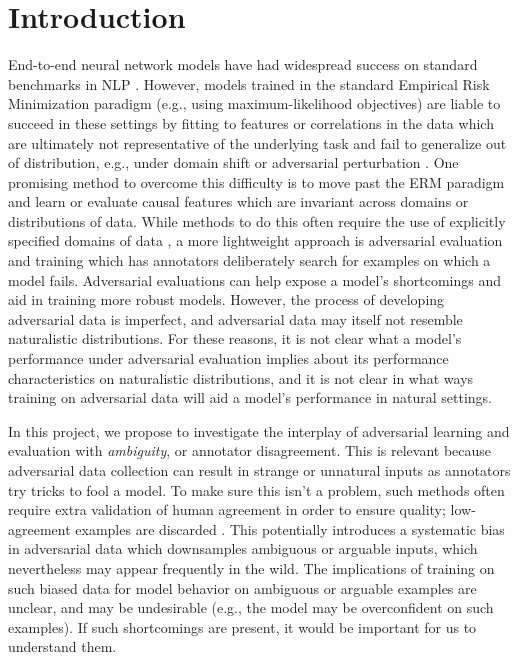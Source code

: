 \documentclass[10pt,a4paper]{article}
\newcommand{\eg}{e.g.}
\begin{document}
\section{Introduction}
End-to-end neural network models have had widespread success on standard benchmarks in NLP
\citep{wang2018glue,wang2019superglue,lee2017end,dozat2017deep}.
However, models trained in the standard Empirical Risk Minimization paradigm (\eg, using
maximum-likelihood objectives) are liable to succeed in these settings by fitting to features or
correlations in the data which are ultimately not representative of the underlying task and fail to
generalize out of distribution, \eg, under domain shift or adversarial perturbation
\citep{gururangan2018annotation,ilyas-etal-2019-adversarial}.
One promising method to overcome this difficulty is to move past the ERM paradigm and learn or
evaluate causal features which are invariant across domains or distributions of data.
While methods to do this often require the use of explicitly specified domains of data
\citep{peters-etal-2016-causal,arjovsky-etal-2020-invariant},
a more lightweight approach is adversarial evaluation and training
\citep{nie-etal-2020-adversarial,kiela-etal-2021-dynabench} which has annotators deliberately search
for examples on which a model fails.
Adversarial evaluations can help expose a model's shortcomings
and aid in training
more robust models.
However, the process of developing adversarial data is imperfect, and adversarial data may itself
not resemble naturalistic distributions.
For these reasons, it is not clear what a model's performance under adversarial evaluation implies
about its performance characteristics on naturalistic distributions,
and it is not clear in what ways training on adversarial data will aid a model's performance in
natural settings.

In this project, we propose to investigate the interplay of adversarial learning and evaluation with
\textit{ambiguity}, or annotator disagreement.
This is relevant because adversarial data collection can result in strange or unnatural inputs as annotators try tricks to fool a model. To make sure this isn't a problem, such methods often require extra validation of human agreement in order to ensure quality; low-agreement examples are discarded \citep{nie-etal-2020-adversarial}.
This potentially introduces a systematic bias in adversarial data which downsamples ambiguous or arguable inputs, which nevertheless may appear frequently in the wild.
The implications of training on such biased data for model behavior on ambiguous or arguable examples are unclear, and may be undesirable (\eg, the model may be overconfident on such examples).
If such shortcomings are present, it would be important for us to understand them.
\end{document}
